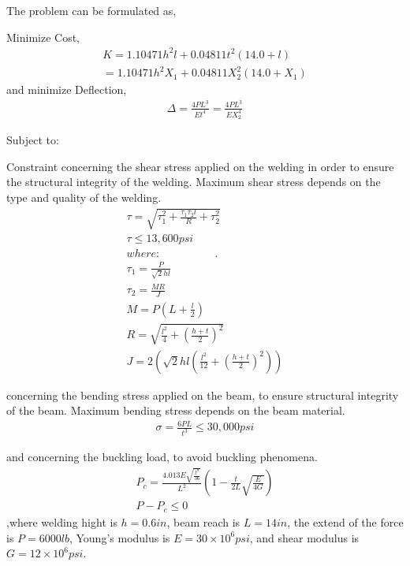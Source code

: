 The problem can be formulated as,

Minimize Cost,
\begin{eqnarray}\nonumber
   K = 1.10471h^2l+0.04811t^2(14.0+l) \\
   = 1.10471h^2X_1+0.04811X_2^2(14.0+X_1)
   \label{Cost} 
\end{eqnarray}
and minimize Deflection,
\begin{eqnarray}
   \Delta = \frac{4PL^3}{Et^4} = \frac{4PL^3}{EX_2^4}
   \label{Deflection} 
\end{eqnarray}

Subject to:


Constraint concerning the shear stress applied on the welding in order to ensure the structural integrity of the welding. Maximum shear stress depends on the type and quality of the welding. 
\begin{eqnarray}
   \tau = \sqrt{\tau_1^2 + \frac{\tau_1 \tau_2 l}{R} +\tau_2^2} \\
   \nonumber \tau \leq 13,600 psi \\
   \nonumber where:~~~~~~~~~~~~~~~~~~~~~~.\\
   \nonumber \tau_1 = \frac{P}{\sqrt{2}hl} \\
   \nonumber \tau_2 = \frac{MR}{J} \\   
   \nonumber M = P(L+\frac{l}{2}) \\ 
   \nonumber R = \sqrt{\frac{l^2}{4} + (\frac{h+t}{2})^2} \\
   \nonumber J = 2\left( \sqrt{2}hl\left( \frac{l^2}{12} + \left(\frac{h+t}{2}\right)^2 \right) \right)
   \label{shear} 
\end{eqnarray}

concerning the bending stress applied on the beam, to ensure structural integrity of the beam. Maximum bending stress depends on the beam material.
\begin{eqnarray}
   \sigma = \frac{6PL}{t^3} \leq 30,000 psi
   \label{bend} 
\end{eqnarray}

and concerning the buckling load, to avoid buckling phenomena.  
\begin{eqnarray}
   P_c = \frac{4.013E\sqrt{\frac{t^8}{36}}}{L^2}\left( 1- \frac{t}{2L}\sqrt{\frac{E}{4G}} \right) \\
   \nonumber  P - P_c \leq 0 
   \label{back} 
\end{eqnarray}
,where welding hight is $h = 0.6 in$, beam reach is $L = 14 in$, the extend of the force is $P = 6000 lb$, Young’s modulus is $E = 30 \times 10^6 psi$, and shear modulus is $G = 12 \times 10^6 psi$.  

